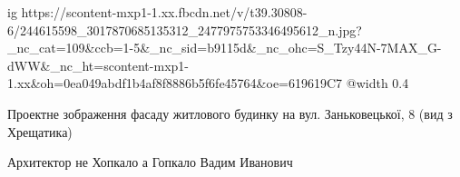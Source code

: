  
 
 
 
 

\ifcmt
  ig https://scontent-mxp1-1.xx.fbcdn.net/v/t39.30808-6/244615598_3017870685135312_2477975753346495612_n.jpg?_nc_cat=109&ccb=1-5&_nc_sid=b9115d&_nc_ohc=S_Tzy44N-7MAX_G-dWW&_nc_ht=scontent-mxp1-1.xx&oh=0ea049abdf1b4af8f8886b5f6fe45764&oe=619619C7
  @width 0.4
\fi


Проектне зображення фасаду житлового будинку на вул. Заньковецької, 8 (вид з
Хрещатика)


Архитектор не Хопкало а Гопкало Вадим Иванович
